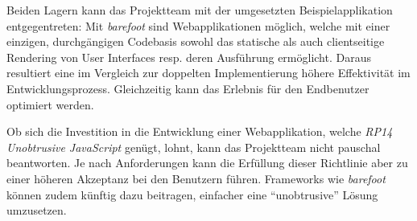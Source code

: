 Beiden Lagern kann das Projektteam mit der umgesetzten Beispielapplikation entgegentreten: Mit \emph{barefoot} sind Webapplikationen möglich, welche mit einer einzigen, durchgängigen Codebasis sowohl das statische als auch clientseitige Rendering von User Interfaces resp. deren Ausführung ermöglicht. Daraus resultiert eine im Vergleich zur doppelten Implementierung höhere Effektivität im Entwicklungsprozess. Gleichzeitig kann das Erlebnis für den Endbenutzer optimiert werden.

Ob sich die Investition in die Entwicklung einer Webapplikation, welche \emph{RP14 Unobtrusive JavaScript} genügt, lohnt, kann das Projektteam nicht pauschal beantworten. Je nach Anforderungen kann die Erfüllung dieser Richtlinie aber zu einer höheren Akzeptanz bei den Benutzern führen. Frameworks wie \emph{barefoot} können zudem künftig dazu beitragen, einfacher eine ``unobtrusive'' Lösung umzusetzen.
